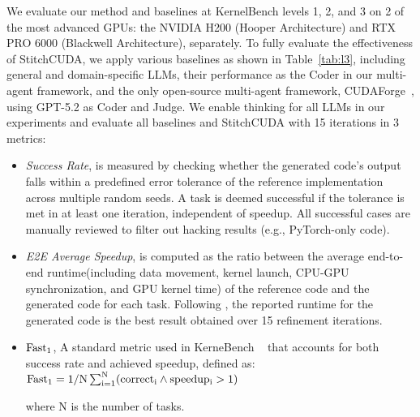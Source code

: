 We evaluate our method and baselines at KernelBench levels 1, 2, and 3 on 2 of the most advanced GPUs: the NVIDIA H200 (Hooper Architecture) and RTX PRO 6000 (Blackwell Architecture), separately. To fully evaluate the effectiveness of StitchCUDA, we apply various baselines as shown in Table~\ref{tab:l3}, including general and domain-specific LLMs, their performance as the Coder in our multi-agent framework, and the only open-source multi-agent framework, CUDAForge~\cite{cudaforge}, using GPT-5.2 as Coder and Judge.
We enable thinking for all LLMs in our experiments and evaluate all baselines and StitchCUDA with 15 iterations in 3 metrics: 
\vspace{-10pt}
\begin{itemize}
    \item \textit{Success Rate}, is measured by checking whether the generated code’s output falls within a predefined error tolerance of the reference implementation across multiple random seeds. A task is deemed successful if the tolerance is met in at least one iteration, independent of speedup. All successful cases are manually reviewed to filter out hacking results (e.g., PyTorch-only code). 
    \item \textit{E2E Average Speedup}, is computed as the ratio between the average end-to-end runtime(including data movement, kernel launch, CPU-GPU synchronization, and GPU kernel time) of the reference code and the generated code for each task. Following \cite{cudaforge}, the reported runtime for the generated code is the best result obtained over 15 refinement iterations.
    \item $\rm{Fast}_1$, A standard metric used in KerneBench ~\cite{kernelbench} that accounts for both success rate and achieved speedup, defined as: 
$\rm{Fast}_1=1/N \sum_{i=1}^{N}(correct_i\wedge{speedup_i > 1})$
   
    where N is the number of tasks.
    
\end{itemize}


